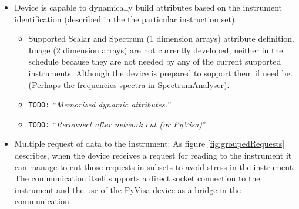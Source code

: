 \documentclass[a4paper,10pt]{article}
\newcommand{\todo}[1]{\texttt{\color{red}TODO:} ``\emph{#1}''}
\begin{document}
\begin{itemize}
    \item Device is capable to dynamically build attributes based on the instrument identification (described in the the particular instruction set).
    \begin{itemize}
        \item Supported Scalar and Spectrum (1 dimension arrays) attribute definition. Image (2 dimension arrays) are not currently developed, neither in the schedule because they are not needed by any of the current supported instruments. Although the device is prepared to sopport them if need be. (Perhaps the frequencies spectra in SpectrumAnalyser).
        \item \todo{Memorized dynamic attributes.}
        \item \todo{Reconnect after network cut (or PyVisa)}
    \end{itemize}
    \item Multiple request of data to the instrument: As figure \ref{fig:groupedRequests} describes, when the device receives a request for reading to the instrument it can manage to cut those requests in subsets to avoid stress in the instrument. The communication itself supports a direct socket connection to the instrument and the use of the PyVisa device as a bridge in the communication.
\end{itemize}

\begin{figure}[h]
\end{figure}
\end{document}
